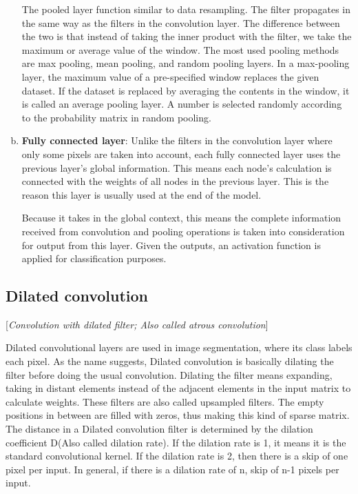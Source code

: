 \begin{enumerate}[(a)]
        The pooled layer function similar to data resampling. The filter propagates in the same way as the filters in the convolution layer. The difference between the two is that instead of taking the inner product with the filter, we take the maximum or average value of the window. The most used pooling methods are max pooling, mean pooling, and random pooling layers. In a max-pooling layer, the maximum value of a pre-specified window replaces the given dataset. If the dataset is replaced by averaging the contents in the window, it is called an average pooling layer. A number is selected randomly according to the probability matrix in random pooling.

    \item \textbf{Fully connected layer}:
        Unlike the filters in the convolution layer where only some pixels are taken into account, each fully connected layer uses the previous layer's global information. This means each node’s calculation is connected with the weights of all nodes in the previous layer. This is the reason this layer is usually used at the end of the model. 

        Because it takes in the global context, this means the complete information received from convolution and pooling operations is taken into consideration for output from this layer. Given the outputs, an activation function is applied for classification purposes.
\end{enumerate}

\subsection{Dilated convolution}
[\textit{Convolution with dilated filter; Also called atrous convolution}]

    Dilated convolutional layers are used in image segmentation, where its class labels each pixel. As the name suggests, Dilated convolution is basically dilating the filter before doing the usual convolution. Dilating the filter means expanding, taking in distant elements instead of the adjacent elements in the input matrix to calculate weights. These filters are also called upsampled filters. The empty positions in between are filled with zeros, thus making this kind of sparse matrix. The distance in a Dilated convolution filter is determined by the dilation coefficient D(Also called dilation rate). If the dilation rate is 1, it means it is the standard convolutional kernel. If the dilation rate is 2, then there is a skip of one pixel per input. In general, if there is a dilation rate of n, skip of n-1 pixels per input.
    
